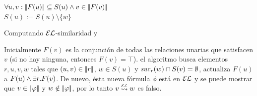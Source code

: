 %
%
%
%


\begin{algorithm}\small
{}
\io


\While{\guard}
{
  $\forall u,v: |\!|F(u)|\!| \subseteq S(u)\wedge v \in |\!|F(v)|\!|$\\
$S(u):=S(u)\setminus\{w\}$ \label{alg:line:loop-body-begin}

} \caption{\small
Computando $\mathcal{EL}$-similaridad y \posre}\label{alg:schematic-GRE}
\end{algorithm}

Inicialmente $F(v)$ es la conjunci\'on de todas las relaciones unarias que
satisfacen $v$ (si no hay ninguna, entonces $F(v)=\top$).
el algoritmo busca elementos $r,u,v,w$ tales que
$(u,v)\in|\!|r|\!|$, $w\in S(u)$ y ${\it suc}_{r}(w)\cap
S(v)=\emptyset$, actualiza $F(u)$ a $F(u)\wedge\exists r. F(v)$.
De nuevo, \'esta nueva f\'ormula $\phi$ est\'a en $\mathcal{EL}$ y se puede mostrar que
$v\in|\!|\varphi|\!|$ y $w\notin|\!|\varphi|\!|$, por lo tanto $v\simil{\EL} w$ es falso.



